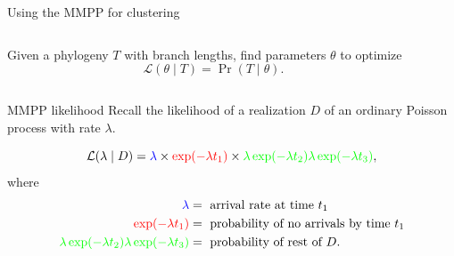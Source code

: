 \documentclass{beamer}
\begin{document}
\begin{frame}[label=steps]{Using the MMPP for clustering}
\begin{columns}
\begin{column}{0.5\textwidth}
        \end{column}
    \end{columns}
    \begin{columns}
        \begin{column}{0.5\textwidth}
            Given a phylogeny $T$ with branch lengths, find parameters $\theta$
            to optimize
            \[
                \mathcal{L}(\theta \mid T) = \Pr(T \mid \theta).
            \]
        \end{column}
        \begin{column}{0.5\textwidth}
        \end{column}
    \end{columns}
\end{frame}

\begin{frame}{MMPP likelihood}
    Recall the likelihood of a realization $D$ of an ordinary Poisson
    process with rate $\lambda$.

    \begin{center}
    \end{center}
    \[
        \mathcal{L}(\lambda \mid D) = \color{blue}\lambda\color{black} \times 
        \color{red}\exp(-\lambda t_1)\color{black} \times
        \color{green}\lambda \exp(-\lambda t_2) \lambda \exp(-\lambda t_3)\color{black},
    \]
    \pause
    where
    \begin{align*}
        \color{blue}\lambda &= \text{ arrival rate at time } t_1 \\
        \color{red}\exp(-\lambda t_1) &= \text{ probability of no arrivals by time } t_1 \\
        \color{green}\lambda \exp(-\lambda t_2) \lambda \exp(-\lambda t_3) &= \text{ probability of rest of } D.
    \end{align*}
\end{frame}
\end{document}
